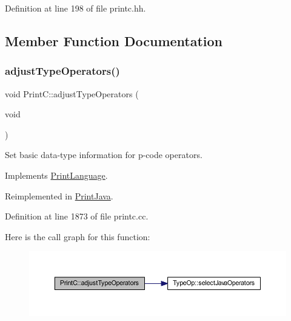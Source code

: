 Definition at line 198 of file printc.\+hh.



\subsection{Member Function Documentation}
\mbox{\label{class_print_c_abbafadf839747f44eca5cb9f30d2bd3c}} 
\subsubsection{\texorpdfstring{adjustTypeOperators()}{adjustTypeOperators()}}
{\footnotesize\ttfamily void Print\+C\+::adjust\+Type\+Operators (\begin{DoxyParamCaption}\item[{void}]{ }\end{DoxyParamCaption})\hspace{0.3cm}{\ttfamily [virtual]}}



Set basic data-\/type information for p-\/code operators. 



Implements \mbox{\hyperlink{class_print_language_afe7b69e9583dfd99d310d7fbcb447986}{Print\+Language}}.



Reimplemented in \mbox{\hyperlink{class_print_java_afcad564cec849b9f7d5ce1eaeb396c7d}{Print\+Java}}.



Definition at line 1873 of file printc.\+cc.

Here is the call graph for this function\+:
\nopagebreak
\begin{figure}[H]
\begin{center}
\leavevmode
\includegraphics[width=350pt]{class_print_c_abbafadf839747f44eca5cb9f30d2bd3c_cgraph}
\end{center}
\end{figure}
\mbox{\label{class_print_c_a18fa1574b22c87e7ef25e4a0b99284ac}} 
